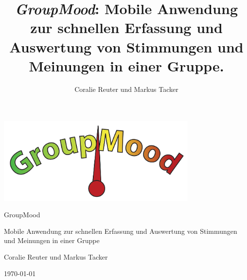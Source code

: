 \documentclass[10pt,a4paper]{article}
\begin{document}
\author{Coralie Reuter und Markus Tacker}
\title{\emph{GroupMood}: Mobile Anwendung zur schnellen Erfassung und Auswertung von Stimmungen und Meinungen in einer Gruppe.}
\begin{center}
\includegraphics[width=10cm]{media/GroupMood.png}

\begin{huge}GroupMood\end{huge}

\begin{large}Mobile Anwendung zur schnellen Erfassung und Auswertung von Stimmungen und Meinungen in einer Gruppe\end{large}

Coralie Reuter und Markus Tacker

\today

\end{center}

\bigskip 



\tableofcontents




\end{document}
